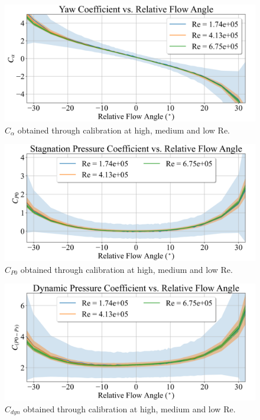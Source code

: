 \documentclass[11pt,a4paper,twocolumn]{article}
\begin{document}
\begin{figure}[!ht]
{\centering
\includegraphics[width = \columnwidth]{exp_2_yaw_coefficient.png}
\caption{$C_\alpha$ obtained through calibration at high, medium and low Re.}
\label{exp_2_fig1}}
\end{figure}

\begin{figure}[!ht]
{\centering
\includegraphics[width = \columnwidth]{exp_2_stg_coefficient.png}
\caption{$C_{P0}$ obtained through calibration at high, medium and low Re.}
\label{exp_2_fig2}}
\end{figure}

\begin{figure}[!ht]
{\centering
\includegraphics[width = \columnwidth]{exp_2_dyn_coefficient.png}
\caption{$C_{dyn}$ obtained through calibration at high, medium and low Re.}
\label{exp_2_fig3}}
\end{figure}
\end{document}
